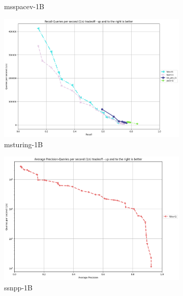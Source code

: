 \begin{figure}[ht]
\begin{subfigure}{10cm}
      \caption{msspacev-1B}
  \end{subfigure}
  \begin{subfigure}{10cm}
    \centering
    \includegraphics[width=\linewidth]{../t1_t2/results/T1/neurips21/msturing-1B.png}
    \caption{msturing-1B}
  \end{subfigure}
  \begin{subfigure}{10cm}
    \centering
    \includegraphics[width=\linewidth]{../t1_t2/results/T1/neurips21/ssnpp-1B.png}
      \caption{ssnpp-1B}
  \end{subfigure}
  \begin{subfigure}{10cm}
    \centering

\end{subfigure}
\end{figure}
